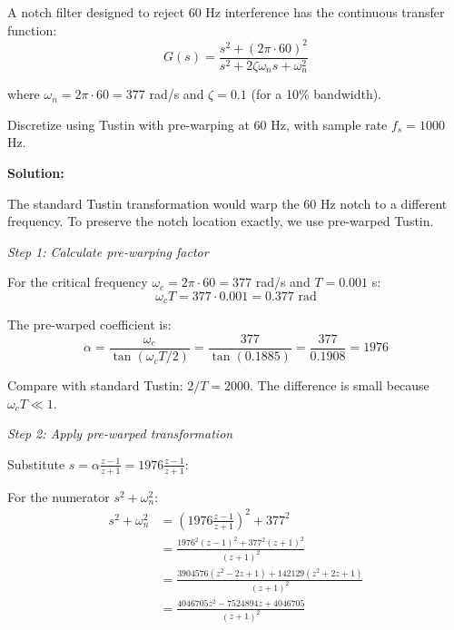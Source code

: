 \begin{example}
\label{ex:prewarping}

A notch filter designed to reject 60 Hz interference has the continuous transfer function:
\begin{equation}
G(s) = \frac{s^2 + (2\pi \cdot 60)^2}{s^2 + 2\zeta\omega_n s + \omega_n^2}
\end{equation}

where $\omega_n = 2\pi \cdot 60 = 377$ rad/s and $\zeta = 0.1$ (for a 10\% bandwidth).

Discretize using Tustin with pre-warping at 60 Hz, with sample rate $f_s = 1000$ Hz.

\textbf{Solution:}

The standard Tustin transformation would warp the 60 Hz notch to a different frequency. To preserve the notch location exactly, we use pre-warped Tustin.

\textit{Step 1: Calculate pre-warping factor}

For the critical frequency $\omega_c = 2\pi \cdot 60 = 377$ rad/s and $T = 0.001$ s:
\begin{equation}
\omega_c T = 377 \cdot 0.001 = 0.377 \text{ rad}
\end{equation}

The pre-warped coefficient is:
\begin{equation}
\alpha = \frac{\omega_c}{\tan(\omega_c T / 2)} = \frac{377}{\tan(0.1885)} = \frac{377}{0.1908} = 1976
\end{equation}

Compare with standard Tustin: $2/T = 2000$. The difference is small because $\omega_c T \ll 1$.

\textit{Step 2: Apply pre-warped transformation}

Substitute $s = \alpha \frac{z-1}{z+1} = 1976 \frac{z-1}{z+1}$:

For the numerator $s^2 + \omega_n^2$:
\begin{align}
s^2 + \omega_n^2 &= \left(1976 \frac{z-1}{z+1}\right)^2 + 377^2 \\
&= \frac{1976^2(z-1)^2 + 377^2(z+1)^2}{(z+1)^2} \\
&= \frac{3904576(z^2 - 2z + 1) + 142129(z^2 + 2z + 1)}{(z+1)^2} \\
&= \frac{4046705z^2 - 7524894z + 4046705}{(z+1)^2}
\end{align}


\end{example}

